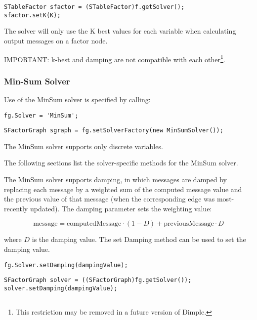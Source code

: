 \ifjava
\begin{lstlisting}
STableFactor sfactor = (STableFactor)f.getSolver();
sfactor.setK(K);
\end{lstlisting}
\fi


The solver will only use the K best values for each variable when calculating output messages on a factor node.

IMPORTANT: k-best and damping are not compatible with each other\footnote{This restriction may be removed in a future version of Dimple.}.





\subsubsection{Min-Sum Solver}

Use of the MinSum solver is specified by calling:

\ifmatlab
\begin{lstlisting}
fg.Solver = 'MinSum';
\end{lstlisting}
\fi

\ifjava
\begin{lstlisting}
SFactorGraph sgraph = fg.setSolverFactory(new MinSumSolver());
\end{lstlisting}
\fi

The MinSum solver supports only discrete variables.

The following sections list the solver-specific methods for the MinSum solver.



The MinSum solver supports damping, in which messages are damped by replacing each message by a weighted sum of the computed message value and the previous value of that message (when the corresponding edge was most-recently updated).  The damping parameter sets the weighting value:

\[
\mathrm{message} = \mathrm{computedMessage} \cdot (1 - D) + \mathrm{previousMessage} \cdot D
\]

where $D$ is the damping value.  The set Damping method can be used to set the damping value.

\ifmatlab
\begin{lstlisting}
fg.Solver.setDamping(dampingValue);
\end{lstlisting}
\fi

\ifjava
\begin{lstlisting}
SFactorGraph solver = ((SFactorGraph)fg.getSolver());
solver.setDamping(dampingValue);
\end{lstlisting}
\fi


